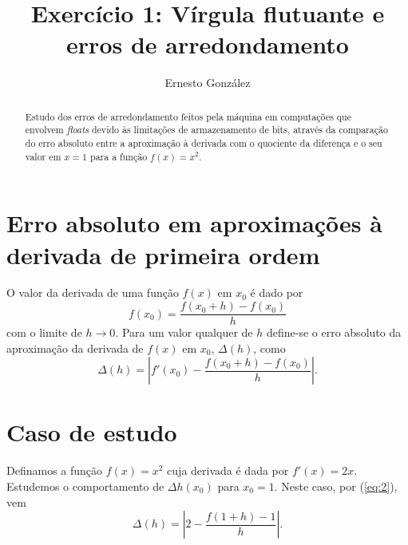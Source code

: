 \documentclass[aps,pre,twocolumn,showpacs,amsmath,amssymb]{revtex4-1}
\begin{document}
\title{Exercício 1: Vírgula flutuante e erros de arredondamento}

\author{Ernesto González}

\begin{abstract}
Estudo dos erros de arredondamento feitos pela máquina em computações que envolvem \textit{floats} devido às limitações de armazenamento de bits, através da comparação do erro absoluto entre a aproximação à derivada com o quociente da diferença e o seu valor em $x=1$ para a função $f(x)=x^2$.
\end{abstract}

\maketitle

\section{Erro absoluto em aproximações à derivada de primeira ordem}
O valor da derivada de uma função $f(x)$ em $x_0$ é dado por
\begin{equation}
f(x_0)=\frac{f(x_0+h)-f(x_0)}{h}
\end{equation}
com o limite de
$h \rightarrow 0$. Para um valor qualquer de $h$ define-se o erro absoluto da aproximação da derivada de $f(x)$ em $x_0$, $\Delta (h)$, como
\begin{equation}
\label{eq:2}
\Delta (h) = \left|f'(x_0)-\frac{f(x_0+h)-f(x_0)}{h}\right|.
\end{equation}

\section{Caso de estudo}
Definamos a função $f(x)=x^2$ cuja derivada é dada por $f'(x)=2x$. Estudemos o comportamento de $\Delta h(x_0)$ para $x_0=1$. Neste caso, por (\ref{eq:2}), vem
\begin{equation}
\Delta(h)=\left|2-\frac{f(1+h)-1}{h}\right|.
\end{equation}
\end{document}
